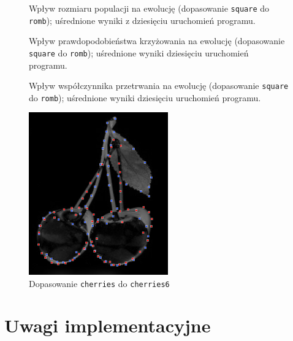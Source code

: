 \documentclass[a4paper,12pt,leqno]{article}
\begin{document}
\begin{figure}\centering
\footnotesize\vspace{-2em}
\normalsize\caption{Wpływ rozmiaru populacji na ewolucję (dopasowanie \texttt{square} do \texttt{romb}); uśrednione wyniki z dziesięciu uruchomień programu.}
\end{figure}
\begin{figure}\centering
\footnotesize\vspace{-2em}
\normalsize\caption{Wpływ prawdopodobieństwa krzyżowania na ewolucję (dopasowanie \texttt{square} do \texttt{romb}); uśrednione wyniki dziesięciu uruchomień programu.}
\end{figure}
\begin{figure}\centering
\footnotesize\vspace{-2em}
\normalsize\caption{Wpływ współczynnika przetrwania na ewolucję (dopasowanie \texttt{square} do \texttt{romb}); uśrednione wyniki dziesięciu uruchomień programu.}
\end{figure}

\begin{figure}\centering
\includegraphics[width=6cm,keepaspectratio=true]{./cherries-match.png}
\caption{Dopasowanie \texttt{cherries} do \texttt{cherries6}}
\end{figure}

\section{Uwagi implementacyjne}
\end{document}
